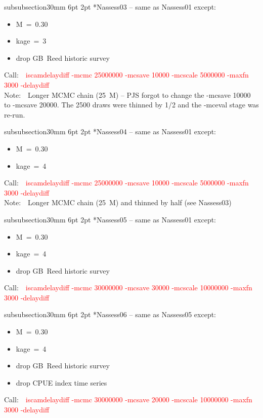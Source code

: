 \documentclass[11pt]{book}
\makeatletter
\newcommand{\red}[1]{{\textcolor{red} {#1}}}
\newcommand{\notecol}[1]{{\textcolor{notecol} {#1}}}
\renewcommand{\subsubsection}{\@startsection%
{subsubsection}{3}{0mm}%
{6pt \@plus -0pt \@minus -0pt}{2pt \@plus 0pt}%
{\normalfont\bf}}%
\newcommand\call[1]{
\footnotesize\selectfont\hangindent=0.35in
Call:~~\red{#1}
\normalsize\selectfont}
\newcommand\note[1]{
\footnotesize\selectfont\hangindent=0.35in
Note:~~\notecol{#1}
\normalsize\selectfont}
\makeatother
\begin{document}
\subsubsection*{Nassess03 -- same as Nassess01 except:}
\begin{itemize}[nosep]
  \item M~=~0.30
  \item kage~=~3
  \item drop GB~Reed historic survey
\end{itemize}
\call{iscamdelaydiff -mcmc 25000000 -mcsave 10000 -mcscale 5000000 -maxfn 3000 -delaydiff}\\
\note{Longer MCMC chain (25~M) -- PJS forgot to change the -mcsave 10000 to -mcsave 20000. The 2500 draws were thinned by 1/2 and the -mceval stage was re-run.}

\subsubsection*{Nassess04 -- same as Nassess01 except:}
\begin{itemize}[nosep]
  \item M~=~0.30
  \item kage~=~4
\end{itemize}
\call{iscamdelaydiff -mcmc 25000000 -mcsave 10000 -mcscale 5000000 -maxfn 3000 -delaydiff}\\
\note{Longer MCMC chain (25~M) and thinned by half (see Nassess03)}

\subsubsection*{Nassess05 -- same as Nassess01 except:}
\begin{itemize}[nosep]
  \item M~=~0.30
  \item kage~=~4
  \item drop GB~Reed historic survey
\end{itemize}
\call{iscamdelaydiff -mcmc 30000000 -mcsave 30000 -mcscale 10000000 -maxfn 3000 -delaydiff}

\subsubsection*{Nassess06 -- same as Nassess05 except:}
\begin{itemize}[nosep]
  \item M~=~0.30
  \item kage~=~4
  \item drop GB~Reed historic survey
  \item drop CPUE index time series
\end{itemize}
\call{iscamdelaydiff -mcmc 30000000 -mcsave 20000 -mcscale 10000000 -maxfn 3000 -delaydiff}
\end{document}
